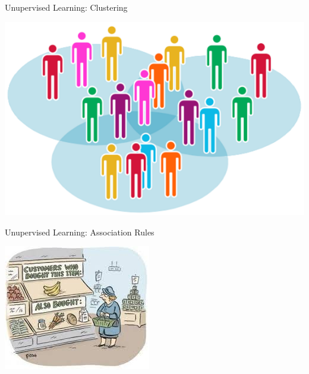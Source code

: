 \documentclass{beamer}
\begin{document}
\begin{frame}{Unupervised Learning: Clustering}

\begin{center}
\includegraphics[width=.7\textwidth]{figs/clustering}
\end{center}

\end{frame}

\begin{frame}{Unupervised Learning: Association Rules}

\begin{center}
\includegraphics[width=.7\textwidth]{figs/associationRules}
\end{center}

\end{frame}


% 
\end{document}
